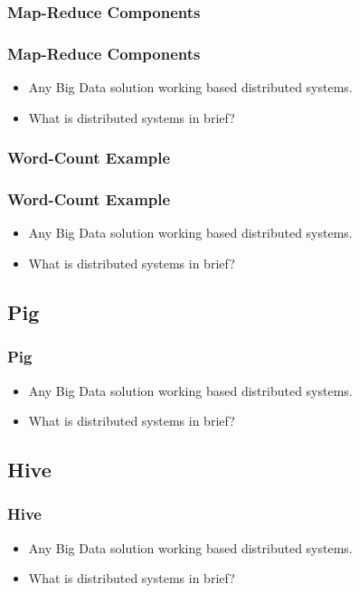 
\subsubsection{Map-Reduce Components}
\begin{frame}
\frametitle{Map-Reduce Components}
\begin{itemize} 
	\item Any Big Data solution working based distributed systems.
	\item What is distributed systems in brief?
\end{itemize}
\end{frame}


\subsubsection{Word-Count Example}
\begin{frame}
\frametitle{Word-Count Example}
\begin{itemize} 
	\item Any Big Data solution working based distributed systems.
	\item What is distributed systems in brief?
\end{itemize}
\end{frame}


\subsection{Pig}
\begin{frame}
\frametitle{Pig}
\begin{itemize} 
	\item Any Big Data solution working based distributed systems.
	\item What is distributed systems in brief?
\end{itemize}
\end{frame}


\subsection{Hive}
\begin{frame}
\frametitle{Hive}
\begin{itemize} 
	\item Any Big Data solution working based distributed systems.
	\item What is distributed systems in brief?
\end{itemize}
\end{frame}


